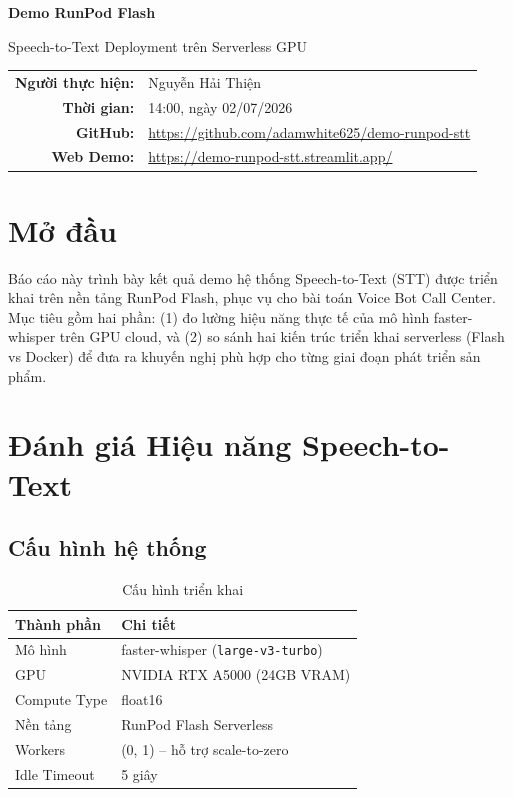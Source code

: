 \documentclass[12pt,a4paper]{article}
\begin{document}
\begin{titlepage}
\centering
\vspace*{4cm}

{\Huge\bfseries Demo RunPod Flash\par}
\vspace{0.5cm}
{\Large Speech-to-Text Deployment trên Serverless GPU\par}

\vspace{3cm}

{\large
\begin{tabular}{rl}
\textbf{Người thực hiện:} & Nguyễn Hải Thiện \\[6pt]
\textbf{Thời gian:} & 14:00, ngày 02/07/2026 \\[6pt]
\textbf{GitHub:} & \url{https://github.com/adamwhite625/demo-runpod-stt} \\[6pt]
\textbf{Web Demo:} & \url{https://demo-runpod-stt.streamlit.app/} \\
\end{tabular}
}

\vfill
\end{titlepage}

\section*{Mở đầu}

Báo cáo này trình bày kết quả demo hệ thống Speech-to-Text (STT) được triển khai trên nền tảng RunPod Flash, phục vụ cho bài toán Voice Bot Call Center. Mục tiêu gồm hai phần: (1) đo lường hiệu năng thực tế của mô hình faster-whisper trên GPU cloud, và (2) so sánh hai kiến trúc triển khai serverless (Flash vs Docker) để đưa ra khuyến nghị phù hợp cho từng giai đoạn phát triển sản phẩm.

\section{Đánh giá Hiệu năng Speech-to-Text}

\subsection{Cấu hình hệ thống}

\begin{table}[H]
\centering
\begin{tabular}{ll}
\toprule
\textbf{Thành phần} & \textbf{Chi tiết} \\
\midrule
Mô hình & faster-whisper (\texttt{large-v3-turbo}) \\
GPU & NVIDIA RTX A5000 (24GB VRAM) \\
Compute Type & float16 \\
Nền tảng & RunPod Flash Serverless \\
Workers & (0, 1) -- hỗ trợ scale-to-zero \\
Idle Timeout & 5 giây \\
\bottomrule
\end{tabular}
\caption{Cấu hình triển khai}
\end{table}
\end{document}
